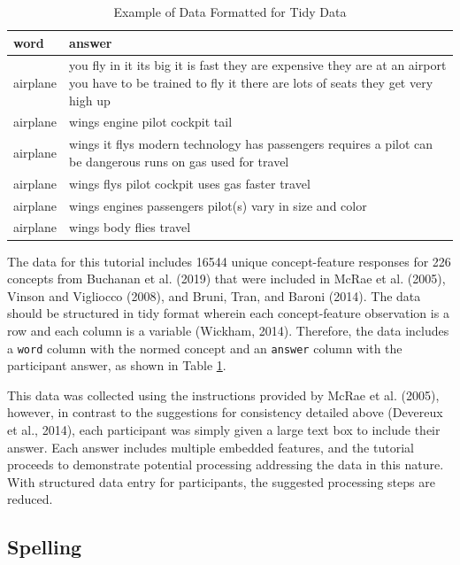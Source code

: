 \documentclass[man]{apa6}
\begin{document}
\begin{table}[t]

\caption{\label{tab:tab1}Example of Data Formatted for Tidy Data}
\centering
\begin{tabular}{l>{\raggedright\arraybackslash}p{30em}}
\toprule
word & answer\\
\midrule
airplane & you fly in it  its big  it is fast  they are expensive  they are at an airport  you have to be trained to fly it  there are lots of seats  they get very high up\\
airplane & wings engine pilot cockpit tail\\
airplane & wings  it flys  modern technology  has passengers  requires a pilot  can be dangerous  runs on gas  used for travel\\
airplane & wings  flys  pilot  cockpit  uses gas  faster travel\\
airplane & wings  engines  passengers  pilot(s)  vary in size and color\\
\addlinespace
airplane & wings  body  flies  travel\\
\bottomrule
\end{tabular}
\end{table}

The data for this tutorial includes 16544 unique concept-feature responses for 226 concepts from Buchanan et al. (2019) that were included in McRae et al. (2005), Vinson and Vigliocco (2008), and Bruni, Tran, and Baroni (2014). The data should be structured in tidy format wherein each concept-feature observation is a row and each column is a variable (Wickham, 2014). Therefore, the data includes a \texttt{word} column with the normed concept and an \texttt{answer} column with the participant answer, as shown in Table \ref{tab:tab1}.

This data was collected using the instructions provided by McRae et al. (2005), however, in contrast to the suggestions for consistency detailed above (Devereux et al., 2014), each participant was simply given a large text box to include their answer. Each answer includes multiple embedded features, and the tutorial proceeds to demonstrate potential processing addressing the data in this nature. With structured data entry for participants, the suggested processing steps are reduced.

\hypertarget{spelling}{%
\subsection{Spelling}\label{spelling}}
\end{document}
